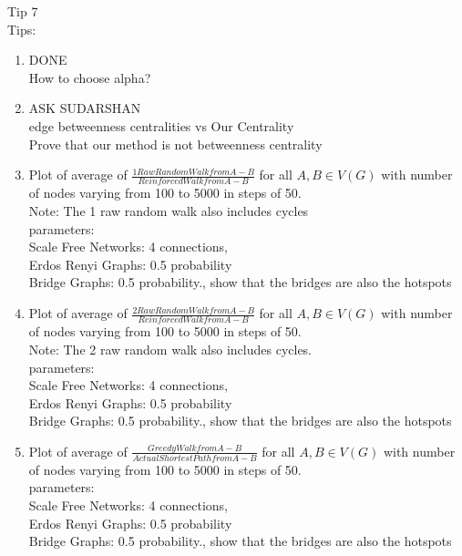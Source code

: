 \documentclass{article}
\begin{document}
Tip 7\\

Tips:
\begin{enumerate}
\item DONE\\
How to choose alpha?

\item ASK SUDARSHAN\\
edge betweenness centralities vs Our Centrality\\
Prove that our method is not betweenness centrality

\item Plot of average of $\frac{1 Raw Random Walk from A-B}{Reinforced Walk from A-B}$ for all $A,B \in V(G)$ with number of nodes varying from 100 to 5000 in steps of 50.\\
Note: The 1 raw random walk also includes cycles\\
parameters:\\
Scale Free Networks: 4 connections, \\
Erdos Renyi Graphs: 0.5 probability\\
Bridge Graphs: 0.5 probability., show that the bridges are also the hotspots\\

\item Plot of average of $\frac{2 Raw Random Walk from A-B}{Reinforced Walk from A-B}$ for all $A,B \in V(G)$ with number of nodes varying from 100 to 5000 in steps of 50.\\
Note: The 2 raw random walk also includes cycles.\\
parameters:\\
Scale Free Networks: 4 connections, \\
Erdos Renyi Graphs: 0.5 probability\\
Bridge Graphs: 0.5 probability., show that the bridges are also the hotspots\\ 

\item Plot of average of $\frac{Greedy Walk from A-B}{Actual Shortest Path from A-B}$ for all $A,B \in V(G)$ with number of nodes varying from 100 to 5000 in steps of 50.\\
parameters:\\
Scale Free Networks: 4 connections, \\
Erdos Renyi Graphs: 0.5 probability\\
Bridge Graphs: 0.5 probability., show that the bridges are also the hotspots\\


\end{enumerate}
\end{document}
